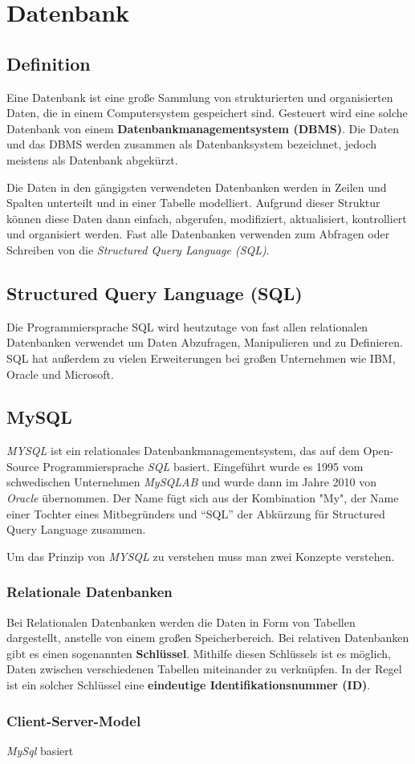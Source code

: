 \section{Datenbank}
\subsection{Definition}
Eine Datenbank ist eine große Sammlung von strukturierten und organisierten Daten,
die in einem Computersystem gespeichert sind. Gesteuert wird eine solche Datenbank von
einem \textbf{Datenbankmanagementsystem (DBMS)}. Die Daten und das DBMS werden zusammen als
Datenbanksystem bezeichnet, jedoch meistens als Datenbank abgekürzt.

Die Daten in den gängigsten verwendeten Datenbanken werden in Zeilen und Spalten unterteilt und
in einer Tabelle modelliert. Aufgrund dieser Struktur können diese Daten dann einfach, abgerufen,
modifiziert, aktualisiert, kontrolliert und organisiert werden. Fast alle Datenbanken verwenden
zum Abfragen oder Schreiben von die \textit{Structured Query Language (SQL)}.
\cite{Datenbank}
\subsection{Structured Query Language (SQL)}
Die Programmiersprache SQL wird heutzutage von fast allen relationalen Datenbanken verwendet
um Daten Abzufragen, Manipulieren und zu Definieren. SQL hat außerdem zu vielen Erweiterungen
bei großen Unternehmen wie IBM, Oracle und Microsoft.

\subsection{MySQL}
\textit{MYSQL} ist ein relationales Datenbankmanagementsystem, das auf dem Open-Source
Programmiersprache \textit{SQL} basiert. Eingeführt wurde es 1995 vom schwedischen Unternehmen
\textit{MySQLAB} und wurde dann im Jahre 2010 von \textit{Oracle} übernommen. Der Name fügt sich
aus der Kombination "My", der Name einer Tochter eines Mitbegründers und ``SQL'' der Abkürzung
für Structured Query Language zusammen.

Um das Prinzip von \textit{MYSQL} zu verstehen muss man zwei Konzepte verstehen.

\subsubsection{Relationale Datenbanken}
Bei Relationalen Datenbanken werden die Daten in Form von Tabellen dargestellt, anstelle von
einem großen Speicherbereich.
Bei relativen Datenbanken gibt es einen sogenannten \textbf{Schlüssel}. Mithilfe diesen Schlüssels
ist es möglich, Daten zwischen verschiedenen Tabellen miteinander zu verknüpfen. In der Regel ist
ein solcher Schlüssel eine \textbf{eindeutige Identifikationsnummer (ID)}.
\subsubsection{Client-Server-Model}
\textit{MySql} basiert

\cite{MySQL}
\label{db}

